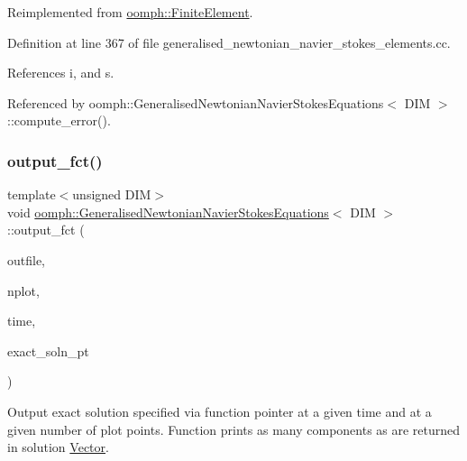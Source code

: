 Reimplemented from \hyperlink{classoomph_1_1FiniteElement_a22b695c714f60ee6cd145be348042035}{oomph\+::\+Finite\+Element}.



Definition at line 367 of file generalised\+\_\+newtonian\+\_\+navier\+\_\+stokes\+\_\+elements.\+cc.



References i, and s.



Referenced by oomph\+::\+Generalised\+Newtonian\+Navier\+Stokes\+Equations$<$ D\+I\+M $>$\+::compute\+\_\+error().

\mbox{\label{classoomph_1_1GeneralisedNewtonianNavierStokesEquations_adf4652164a709749ba63c8d7fff7efdd}} 
\subsubsection{\texorpdfstring{output\+\_\+fct()}{output\_fct()}\hspace{0.1cm}{\footnotesize\ttfamily [2/2]}}
{\footnotesize\ttfamily template$<$unsigned D\+IM$>$ \\
void \hyperlink{classoomph_1_1GeneralisedNewtonianNavierStokesEquations}{oomph\+::\+Generalised\+Newtonian\+Navier\+Stokes\+Equations}$<$ D\+IM $>$\+::output\+\_\+fct (\begin{DoxyParamCaption}\item[{std\+::ostream \&}]{outfile,  }\item[{const unsigned \&}]{nplot,  }\item[{const double \&}]{time,  }\item[{\hyperlink{classoomph_1_1FiniteElement_ad4ecf2b61b158a4b4d351a60d23c633e}{Finite\+Element\+::\+Unsteady\+Exact\+Solution\+Fct\+Pt}}]{exact\+\_\+soln\+\_\+pt }\end{DoxyParamCaption})\hspace{0.3cm}{\ttfamily [virtual]}}



Output exact solution specified via function pointer at a given time and at a given number of plot points. Function prints as many components as are returned in solution \hyperlink{classoomph_1_1Vector}{Vector}. 

